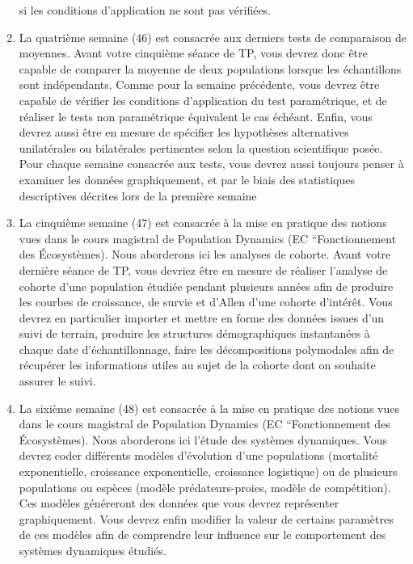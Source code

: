 \documentclass[
  a4paper,
  DIV=11,
  numbers=noendperiod,
  oneside]{scrreprt}
\begin{document}
\begin{enumerate}
  si les conditions d'application ne sont pas vérifiées.
\item
  La quatrième semaine (46) est consacrée aux derniers tests de
  comparaison de moyennes. Avant votre cinquième séance de TP, vous
  devrez donc être capable de comparer la moyenne de deux populations
  lorsque les échantillons sont indépendants. Comme pour la semaine
  précédente, vous devrez être capable de vérifier les conditions
  d'application du test paramétrique, et de réaliser le tests non
  paramétrique équivalent le cas échéant. Enfin, vous devrez aussi être
  en mesure de spécifier les hypothèses alternatives unilatérales ou
  bilatérales pertinentes selon la question scientifique posée. Pour
  chaque semaine consacrée aux tests, vous devrez aussi toujours penser
  à examiner les données graphiquement, et par le biais des statistiques
  descriptives décrites lors de la première semaine
\item
  La cinquième semaine (47) est consacrée à la mise en pratique des
  notions vues dans le cours magistral de Population Dynamics (EC
  ``Fonctionnement des Écosystèmes). Nous aborderons ici les analyses de
  cohorte. Avant votre dernière séance de TP, vous devriez être en
  mesure de réaliser l'analyse de cohorte d'une population étudiée
  pendant plusieurs années afin de produire les courbes de croissance,
  de survie et d'Allen d'une cohorte d'intérêt. Vous devrez en
  particulier importer et mettre en forme des données issues d'un suivi
  de terrain, produire les structures démographiques instantanées à
  chaque date d'échantillonnage, faire les décompositions polymodales
  afin de récupérer les informations utiles au sujet de la cohorte dont
  on souhaite assurer le suivi.
\item
  La sixième semaine (48) est consacrée à la mise en pratique des
  notions vues dans le cours magistral de Population Dynamics (EC
  ``Fonctionnement des Écosystèmes). Nous aborderons ici l'étude des
  systèmes dynamiques. Vous devrez coder différents modèles d'évolution
  d'une populations (mortalité exponentielle, croissance exponentielle,
  croissance logistique) ou de plusieurs populations ou espèces (modèle
  prédateurs-proies, modèle de compétition). Ces modèles généreront des
  données que vous devrez représenter graphiquement. Vous devrez enfin
  modifier la valeur de certains paramètres de ces modèles afin de
  comprendre leur influence sur le comportement des systèmes dynamiques
  étudiés.
\end{enumerate}
\end{document}

